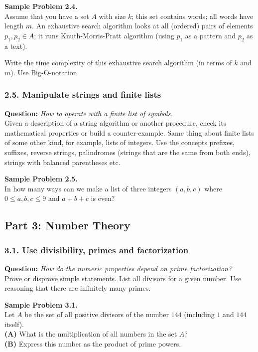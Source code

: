 \documentclass[jou]{apa6}
\begin{document}
\vspace{6pt}
{\bf Sample Problem 2.4.}\\
Assume that you have a set $A$ with size $k$; this set contains 
words; all words have length $m$. An exhaustive search algorithm 
looks at all (ordered) pairs of elements $p_1,p_2 \in A$; 
it runs Knuth-Morris-Pratt algorithm (using $p_1$ as a pattern
and $p_2$ as a text). 

Write the time complexity of this exhaustive search algorithm 
(in terms of $k$ and $m$). Use Big-O-notation.


\subsubsection{2.5. Manipulate strings and finite lists}

{\bf Question:} {\em How to operate with a finite list of symbols.}\\
{\scriptsize 
Given a description of a string algorithm or another procedure, 
check its mathematical properties or build a counter-example. 
Same thing about finite lists of some other kind, for example, lists of integers. 
Use the concepts prefixes, suffixes, reverse strings, palindromes 
(strings that are the same from both ends), strings with balanced parentheses etc.
}

\vspace{6pt}
{\bf Sample Problem 2.5.}\\
In how many ways  can we make a list of three integers $(a,b,c)$ where 
$0 \leq a,b,c \leq 9$ and $a+b+c$ is even?


\newpage
\subsection{Part 3: Number Theory}

\subsubsection{3.1. Use divisibility, primes and factorization}

{\bf Question:} {\em How do the numeric properties depend on prime factorization?}\\
{\scriptsize 
Prove or disprove simple statements. List all divisors for a given number. 
Use reasoning that there are infinitely many primes.
}

\vspace{6pt}
{\bf Sample Problem 3.1.}\\
Let $A$ be the set of all positive divisors of the number $144$ 
(including $1$ and $144$ itself).\\
{\bf (A)} What is the multiplication of all 
numbers in the set $A$?\\
{\bf (B)} Express this number as the product of prime powers.
\end{document}
